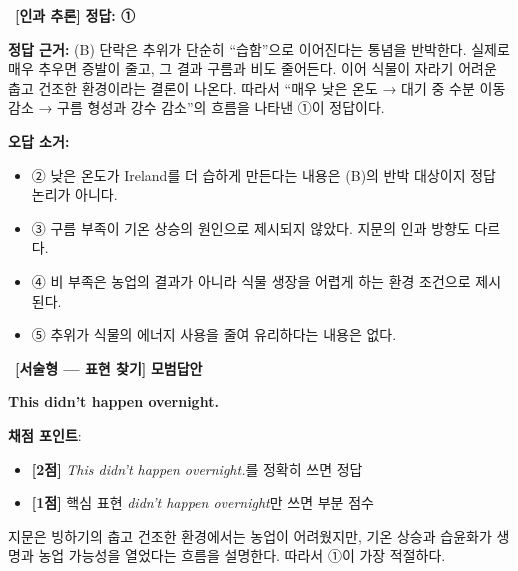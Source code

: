 \documentclass[11pt,a4paper]{article}
\newcommand{\qno}[1]{\par\vspace{10pt}\noindent{\sffamily\bfseries #1.}\ }
\begin{document}
\bigskip

\qno{2}\textbf{[인과 추론]} \textbf{정답: ①}

\vspace{4pt}
\noindent\textbf{정답 근거:} (B) 단락은 추위가 단순히 ``습함''으로 이어진다는 통념을 반박한다. 실제로 매우 추우면 증발이 줄고, 그 결과 구름과 비도 줄어든다. 이어 식물이 자라기 어려운 춥고 건조한 환경이라는 결론이 나온다. 따라서 ``매우 낮은 온도 → 대기 중 수분 이동 감소 → 구름 형성과 강수 감소''의 흐름을 나타낸 ①이 정답이다.

\vspace{4pt}
\noindent\textbf{오답 소거:}
\begin{itemize}[leftmargin=2em,itemsep=2pt]
  \item ② 낮은 온도가 Ireland를 더 습하게 만든다는 내용은 (B)의 반박 대상이지 정답 논리가 아니다.
  \item ③ 구름 부족이 기온 상승의 원인으로 제시되지 않았다. 지문의 인과 방향도 다르다.
  \item ④ 비 부족은 농업의 결과가 아니라 식물 생장을 어렵게 하는 환경 조건으로 제시된다.
  \item ⑤ 추위가 식물의 에너지 사용을 줄여 유리하다는 내용은 없다.
\end{itemize}

\bigskip

\qno{3}\textbf{[서술형 --- 표현 찾기]} \textbf{모범답안}

\vspace{6pt}
\begin{pbox}
\textbf{This didn't happen overnight.}
\end{pbox}

\vspace{6pt}
\noindent\textbf{채점 포인트}:
\begin{itemize}[leftmargin=2em,itemsep=2pt]
  \item \textbf{[2점]} \textit{This didn't happen overnight.}를 정확히 쓰면 정답
  \item \textbf{[1점]} 핵심 표현 \textit{didn't happen overnight}만 쓰면 부분 점수
\end{itemize}

\vspace{8pt}
\par 지문은 빙하기의 춥고 건조한 환경에서는 농업이 어려웠지만, 기온 상승과 습윤화가 생명과 농업 가능성을 열었다는 흐름을 설명한다. 따라서 ①이 가장 적절하다.
\end{document}
